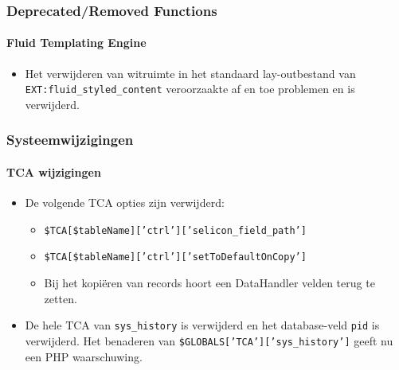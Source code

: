 
\begin{frame}[fragile]
	\frametitle{Deprecated/Removed Functions}
	\framesubtitle{Fluid Templating Engine}

	\begin{itemize}
		\item Het verwijderen van witruimte in het standaard lay-outbestand van \texttt{EXT:fluid\_styled\_content}
			veroorzaakte af en toe problemen en is verwijderd.

	\end{itemize}

\end{frame}


\begin{frame}[fragile]
	\frametitle{Systeemwijzigingen}
	\framesubtitle{TCA wijzigingen}

	\begin{itemize}
		\item De volgende TCA opties zijn verwijderd:

			\begin{itemize}
				\item \texttt{\$TCA[\$tableName]['ctrl']['selicon\_field\_path']}
				\item \texttt{\$TCA[\$tableName]['ctrl']['setToDefaultOnCopy']}
			\end{itemize}

			\begin{itemize}\smaller
				\item[\ding{228}] Bij het kopiëren van records hoort een DataHandler velden terug te zetten.
			\end{itemize}\normalsize

		\item De hele TCA van \texttt{sys\_history} is verwijderd en het database-veld \texttt{pid} is verwijderd.
			Het benaderen van \texttt{\$GLOBALS['TCA']['sys\_history']} geeft nu een PHP waarschuwing.

	\end{itemize}

\end{frame}

